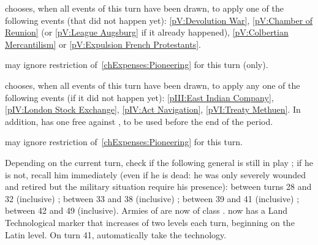 

\phevnt
\aparag \FRA chooses, when all events of this turn have been drawn, to apply
one of the following events (that did not happen yet): \ref{pV:Devolution
  War}, \ref{pV:Chamber of Reunion} (or \ref{pV:League Augsburg} if it already
happened), \ref{pV:Colbertian Mercantilism} or \ref{pV:Expulsion French
  Protestants}.

\phadm
\aparag \FRA may ignore restriction of~\ref{chExpenses:Pioneering} for this
turn (only).




\history{}

\phevnt
\aparag \ENG chooses, when all events of this turn have been drawn, to apply
any one of the following events (if it did not happen yet): \ref{pIII:East
  Indian Company}, \ref{pIV:London Stock Exchange}, \ref{pIV:Act Navigation},
\ref{pVI:Treaty Methuen}.
\aparag In addition, \ENG has one free \OCB against \HOL, to be used before
the end of the period.

\phadm
\aparag \ENG may ignore restriction of~\ref{chExpenses:Pioneering} for this
turn.





\phevnt
\aparag Depending on the current turn, check if the following general is still
in play ; if he is not, recall him immediately (even if he is dead: he was
only severely wounded and retired but the military situation require his
presence):
\bparag \leaderPappenheim between turns 28 and 32 (inclusive) ;
\bparag \leaderMontecuccoli between 33 and 38 (inclusive) ;
\bparag {} between 39 and 41 (inclusive) ;
\bparag {} between 42 and 49 (inclusive).
\aparag Armies of \AUSaus are now of class \CAIV.
\aparag \AUSMin now has a Land Technological marker that increases of two
levels each turn, beginning on the Latin level.
\bparag On turn 41, \HAB automatically take the \TMAN technology.





